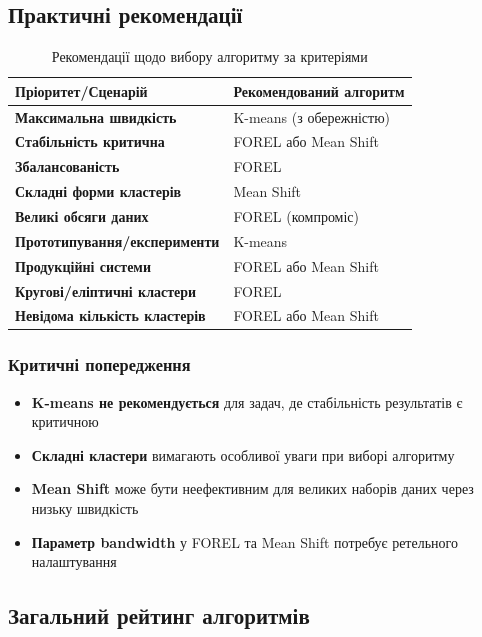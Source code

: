 \documentclass[12pt,a4paper]{article}
\begin{document}
\subsection{Практичні рекомендації}

\begin{table}[H]
\centering
\caption{Рекомендації щодо вибору алгоритму за критеріями}
\begin{tabular}{@{}ll@{}}
\toprule
\textbf{Пріоритет/Сценарій} & \textbf{Рекомендований алгоритм} \\
\midrule
\textbf{Максимальна швидкість} & K-means (з обережністю) \\
\textbf{Стабільність критична} & FOREL або Mean Shift \\
\textbf{Збалансованість} & FOREL \\
\textbf{Складні форми кластерів} & Mean Shift \\
\textbf{Великі обсяги даних} & FOREL (компроміс) \\
\textbf{Прототипування/експерименти} & K-means \\
\textbf{Продукційні системи} & FOREL або Mean Shift \\
\textbf{Кругові/еліптичні кластери} & FOREL \\
\textbf{Невідома кількість кластерів} & FOREL або Mean Shift \\
\bottomrule
\end{tabular}
\end{table}

\subsubsection{Критичні попередження}

\begin{itemize}
    \item \textbf{K-means не рекомендується} для задач, де стабільність результатів є критичною
    \item \textbf{Складні кластери} вимагають особливої уваги при виборі алгоритму
    \item \textbf{Mean Shift} може бути неефективним для великих наборів даних через низьку швидкість
    \item \textbf{Параметр bandwidth} у FOREL та Mean Shift потребує ретельного налаштування
\end{itemize}

\subsection{Загальний рейтинг алгоритмів}
\end{document}
